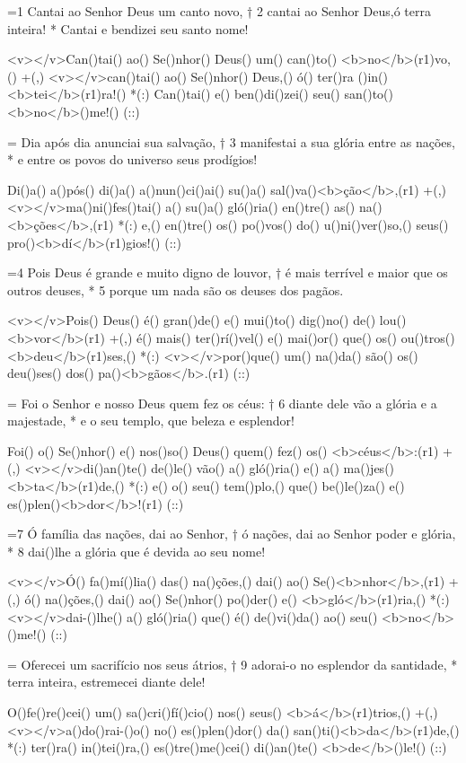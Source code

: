 =1 Cantai ao Senhor Deus um canto novo, † 
2 cantai ao Senhor Deus,ó terra inteira! * 
Cantai e bendizei seu santo nome!

<v></v>Can()tai() ao() Se()nhor() Deus() um() can()to() <b>no</b>(r1)vo,() +(,)
<v></v>can()tai() ao() Se()nhor() Deus,() ó() ter()ra ()in()<b>tei</b>(r1)ra!() *(:)
Can()tai() e() ben()di()zei() seu() san()to() <b>no</b>()me!() (::)

= Dia após dia anunciai sua salvação, † 
3 manifestai a sua glória entre as nações, * 
e entre os povos do universo seus prodígios!

Di()a() a()pós() di()a() a()nun()ci()ai() su()a() sal()va()<b>ção</b>,(r1) +(,)
<v></v>ma()ni()fes()tai() a() su()a() gló()ria() en()tre() as() na()<b>ções</b>,(r1) *(:)
e,() en()tre() os() po()vos() do() u()ni()ver()so,() seus() pro()<b>dí</b>(r1)gios!() (::)

=4 Pois Deus é grande e muito digno de louvor, † 
é mais terrível e maior que os outros deuses, *
5 porque um nada são os deuses dos pagãos.

<v></v>Pois() Deus() é() gran()de() e() mui()to() dig()no() de() lou()<b>vor</b>(r1) +(,)
é() mais() ter()rí()vel() e() mai()or() que() os() ou()tros() <b>deu</b>(r1)ses,() *(:)
<v></v>por()que() um() na()da() são() os() deu()ses() dos() pa()<b>gãos</b>.(r1) (::)

= Foi o Senhor e nosso Deus quem fez os céus: † 
6 diante dele vão a glória e a majestade, * 
e o seu templo, que beleza e esplendor!

Foi() o() Se()nhor() e() nos()so() Deus() quem() fez() os() <b>céus</b>:(r1) +(,)
<v></v>di()an()te() de()le() vão() a() gló()ria() e() a() ma()jes()<b>ta</b>(r1)de,() *(:)
e() o() seu() tem()plo,() que() be()le()za() e() es()plen()<b>dor</b>!(r1) (::)

=7 Ó família das nações, dai ao Senhor, † 
ó nações, dai ao Senhor poder e glória, * 
8 dai()lhe a glória que é devida ao seu nome!

<v></v>Ó() fa()mí()lia() das() na()ções,() dai() ao() Se()<b>nhor</b>,(r1) +(,)
ó() na()ções,() dai() ao() Se()nhor() po()der() e() <b>gló</b>(r1)ria,() *(:)
<v></v>dai-()lhe() a() gló()ria() que() é() de()vi()da() ao() seu() <b>no</b>()me!() (::)

= Oferecei um sacrifício nos seus átrios, †
9 adorai-o no esplendor da santidade, * 
terra inteira, estremecei diante dele!

O()fe()re()cei() um() sa()cri()fí()cio() nos() seus() <b>á</b>(r1)trios,() +(,)
<v></v>a()do()rai-()o() no() es()plen()dor() da() san()ti()<b>da</b>(r1)de,() *(:)
ter()ra() in()tei()ra,() es()tre()me()cei() di()an()te() <b>de</b>()le!() (::)

